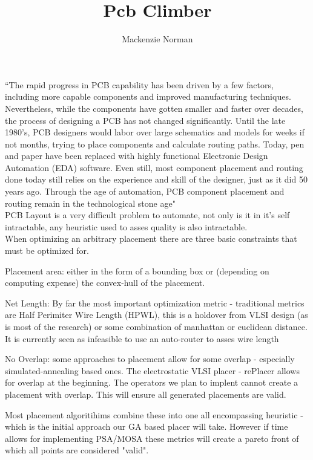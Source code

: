 \documentclass{article}
\title{Pcb Climber}
\author{Mackenzie Norman}
\begin{document}
\maketitle


``The rapid progress in PCB capability has been driven by a few factors, including more capable components and improved manufacturing techniques. Nevertheless, while the components have gotten smaller and faster over decades, the process of designing a PCB has not changed significantly. Until the late 1980’s, PCB designers would labor over large schematics and models for weeks if not months, trying to place components and calculate routing paths. Today, pen and paper have been replaced with highly functional Electronic Design Automation (EDA) software. Even still, most component placement and routing done today still relies on the experience and skill of the designer, just as it did 50 years ago. Through the age of automation, PCB component placement and routing remain in the technological stone age" \\

PCB Layout is a very difficult problem to automate, not only is it in it's self intractable, any heuristic used to asses quality is also intractable.\\

When optimizing an arbitrary placement there are three basic constraints that must be optimized for.

Placement area: either in the form of a bounding box or (depending on computing expense) the convex-hull of the placement. 

Net Length: By far the most important optimization metric - traditional metrics are Half Perimiter Wire Length (HPWL), this is a holdover from VLSI design (as is most of the research) or some combination of manhattan or euclidean distance. It is currently seen as infeasible to use an auto-router to asses wire length

No Overlap: some approaches to placement allow for some overlap - especially simulated-annealing based ones. The electrostatic VLSI placer - rePlacer allows for overlap at the beginning. The operators we plan to implent cannot create a placement with overlap. This will ensure all generated placements are valid. 

Most placement algoritihims combine these into one all encompassing heuristic - which is the initial approach our GA based placer will take. However if time allows for implementing PSA/MOSA these metrics will create a pareto front of which all points are considered "valid". 
\end{document}
